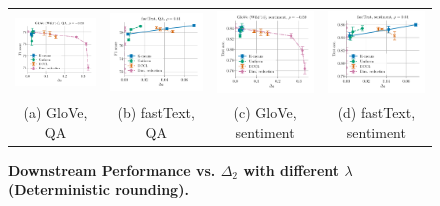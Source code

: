 \begin{figure}
\begin{tabular}{@{\hskip -0.0in}c@{\hskip -0.0in}c@{\hskip -0.0in}c@{\hskip -0.0in}c@{\hskip -0.0in}}
		\includegraphics[width=.245\linewidth]{figures/glove400k_qa_best-f1_vs_gram-large-dim-delta2-6_linx_stoc.pdf} &
		\includegraphics[width=.245\linewidth]{figures/fasttext1m_qa_best-f1_vs_gram-large-dim-delta2-6_linx_stoc.pdf} &
		\includegraphics[width=.245\linewidth]{figures/glove400k_sentiment_sst_test-acc_vs_gram-large-dim-delta2-6_linx_stoc.pdf} &
		\includegraphics[width=.245\linewidth]{figures/fasttext1m_sentiment_sst_test-acc_vs_gram-large-dim-delta2-6_linx_stoc.pdf} \\[-1em]
		(a) GloVe, QA & (b) fastText, QA  & (c) GloVe, sentiment & (d) fastText, sentiment
	\end{tabular}
	\caption{
		\textbf{Downstream Performance vs. $\Delta_2$ with different $\lambda$ (Deterministic rounding).}}
	\label{fig:delta2_lambda}
\end{figure}





